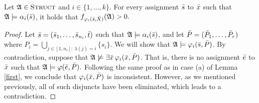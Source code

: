 \begin{enumerate}
	
	\begin{claim} \label{alpha}
		Let $\A\in\str$ and $i\in\{1,\ldots,k\}$. For every assignment $\s$ to $\x$ such that $\A\models\alpha_i(\s)$, it holds that $f_{\varphi_i(\s,\X)}(\A) > 0.$
	\end{claim}
	\begin{proof}
		Let $\s = (\s_1,\ldots,\s_{n_i},\t)$ such that $\A\models\alpha_i(\s)$, and let $\P = (\P_1,\ldots,\P_r)$ where $P_i = \bigcup_{j\in[1,n_i]:\:\lambda(j)=i}\{s_i\}$. We will show that $\A\models\varphi_i(\s,\P)$. By contradiction, suppose that $\A\not\models\exists\x\,\varphi_i(\x,\P)$. That is, there is no assignment $\e$ to $\x$ such that $\A\models\varphi(\e,\P).$ Following the same proof as in case (a) of Lemma \ref{first}, we conclude that $\varphi_i(\x,\P)$ is inconsistent. However, as we mentioned previously, all of such disjuncts have been eliminated, which leads to a contradiction.
	\end{proof}
	

\end{enumerate}

